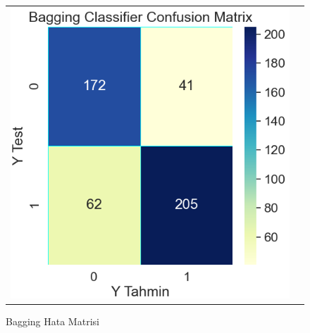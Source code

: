 \documentclass[conference]{IEEEtran}
\begin{document}
\begin{figure}[!h]
	\centering
	\begin{center}
		\begin{tabular}{cc}
			\includegraphics[scale=0.4]{pictures/pic_14.png}&
		\end{tabular}
	\end{center}
	\caption{Bagging Hata Matrisi}
	\label{fig:14}
\end{figure}
\pagebreak
\end{document}
